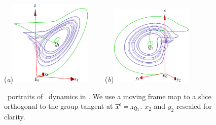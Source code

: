 \begin{figure}[ht]
\begin{center}
  (\textit{a})\includegraphics[width=0.35\textwidth,clip=true]{../figs/CLEmfReqb1}
~~~~(\textit{b})\includegraphics[width=0.35\textwidth,clip=true]{../figs/CLEmfReqb}
\end{center}
\caption{
\Statesp\ portraits of \cLe\ dynamics in \reducedsp. We use a
moving frame map to a slice orthogonal to the group tangent
at  ${\overline{x}^o}  = x_{\mathrm{Q}_{1}}$. $x_2$ and $y_2$ rescaled
for clarity.
    }
\label{fig:CLEmfReqb1}
\end{figure}

